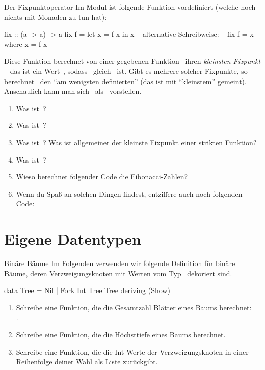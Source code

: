 \documentclass{uebblatt}
\begin{document}
\begin{aufgabe}{Der Fixpunktoperator}
Im Modul  ist folgende Funktion vordefiniert
(welche noch nichts mit Monaden zu tun hat):
\begin{haskellcode}
fix :: (a -> a) -> a
fix f = let x = f x in x
-- alternative Schreibweise:
-- fix f = x where x = f x
\end{haskellcode}
Diese Funktion berechnet von einer gegebenen Funktion~ ihren
\emph{kleinsten Fixpunkt} -- das ist ein Wert~,
sodass~ gleich~ ist. Gibt es mehrere
solcher Fixpunkte, so berechnet~ den "`am wenigsten
definierten"' (das ist mit "`kleinstem"' gemeint). Anschaulich kann man
sich~ als~ vorstellen.

\begin{enumerate}
\item Was ist~?
\item Was ist~?
\item Was ist~? Was ist allgemeiner der kleinste Fixpunkt
einer strikten Funktion?
\item Was ist~?
\item Wieso berechnet folgender Code die Fibonacci-Zahlen?
\item Wenn du Spaß an solchen Dingen findest, entziffere auch noch folgenden Code:
\end{enumerate}
\end{aufgabe}


\section{Eigene Datentypen}

\begin{aufgabe}{Binäre Bäume}
Im Folgenden verwenden wir folgende Definition für binäre Bäume, deren
Verzweigungsknoten mit Werten vom Typ~ dekoriert sind.
\begin{haskellcode}
data Tree = Nil | Fork Int Tree Tree
    deriving (Show)
\end{haskellcode}
\begin{enumerate}
\item Schreibe eine Funktion, die die Gesamtzahl Blätter eines Baums berechnet: \\
.
\item Schreibe eine Funktion, die die Höchsttiefe eines Baums berechnet.
\item Schreibe eine Funktion, die die Int-Werte der Verzweigungsknoten in einer
Reihenfolge deiner Wahl als Liste zurückgibt.
\end{enumerate}
\end{aufgabe}
\end{document}
